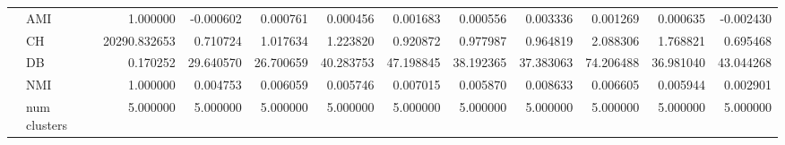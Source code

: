 \begin{tabular}{llrrrrrrrrrr}
 & AMI & 1.000000 & -0.000602 & 0.000761 & 0.000456 & 0.001683 & 0.000556 & 0.003336 & 0.001269 & 0.000635 & -0.002430 \\
 & CH & 20290.832653 & 0.710724 & 1.017634 & 1.223820 & 0.920872 & 0.977987 & 0.964819 & 2.088306 & 1.768821 & 0.695468 \\
 & DB & 0.170252 & 29.640570 & 26.700659 & 40.283753 & 47.198845 & 38.192365 & 37.383063 & 74.206488 & 36.981040 & 43.044268 \\
 & NMI & 1.000000 & 0.004753 & 0.006059 & 0.005746 & 0.007015 & 0.005870 & 0.008633 & 0.006605 & 0.005944 & 0.002901 \\
 & num clusters & 5.000000 & 5.000000 & 5.000000 & 5.000000 & 5.000000 & 5.000000 & 5.000000 & 5.000000 & 5.000000 & 5.000000 \\
\bottomrule
\end{tabular}
